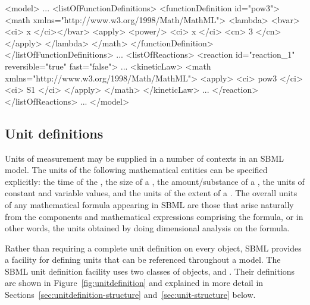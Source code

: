\begin{example}
<model>
    ...
    <listOfFunctionDefinitions>
        <functionDefinition id="pow3">
            <math xmlns="http://www.w3.org/1998/Math/MathML">
                <lambda>
                    <bvar><ci> x </ci></bvar>
                    <apply>
                        <power/>
                        <ci> x </ci>
                        <cn> 3 </cn>
                    </apply>
                </lambda>
            </math>
        </functionDefinition>
    </listOfFunctionDefinitions>
    ...
    <listOfReactions>
        <reaction id="reaction_1" reversible="true" fast="false">
            ...
            <kineticLaw>
                <math xmlns="http://www.w3.org/1998/Math/MathML">
                    <apply>
                        <ci> pow3 </ci>
                        <ci> S1 </ci>
                     </apply>
                </math>
            </kineticLaw>
            ...
        </reaction>
    </listOfReactions>
    ...
</model>\end{example}


\subsection{Unit definitions}
\label{sec:unitdefinitions}

Units of measurement may be supplied in a number of contexts in an
SBML model.  The units of the following mathematical entities can
be specified explicitly: the time of the \Model, the size of a
\Compartment, the amount/substance of a \Species, the units of
constant and variable \Parameter values, and the units of the 
extent of a \Reaction.  The overall units of any mathematical
formula appearing in SBML are those that arise naturally from the
components and mathematical expressions comprising the formula, or
in other words, the units obtained by doing dimensional analysis
on the formula.

Rather than requiring a complete unit definition on every object,
SBML provides a facility for defining units that can be referenced
throughout a model.  The SBML unit definition facility uses two
classes of objects, \UnitDefinition and \Unit.  Their definitions
are shown in Figure~\vref{fig:unitdefinition} and explained in
more detail in Sections~\ref{sec:unitdefinition-structure}
and~\ref{sec:unit-structure} below.

